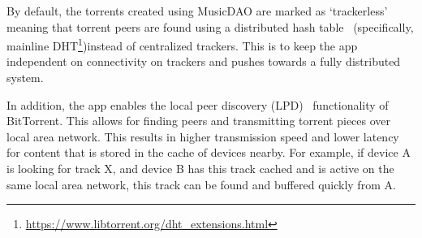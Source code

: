 By default, the torrents created using MusicDAO are marked as `trackerless' meaning that torrent peers are found using a distributed hash table~\citep{dht2019} (specifically, mainline DHT\footnote{\url{https://www.libtorrent.org/dht_extensions.html}})instead of centralized trackers. This is to keep the app independent on connectivity on trackers and pushes towards a fully distributed system.

In addition, the app enables the local peer discovery (LPD)~\citep{bittorrentbep142015} functionality of BitTorrent. This allows for finding peers and transmitting torrent pieces over local area network. This results in higher transmission speed and lower latency for content that is stored in the cache of devices nearby. For example, if device A is looking for track X, and device B has this track cached and is active on the same local area network, this track can be found and buffered quickly from A.
